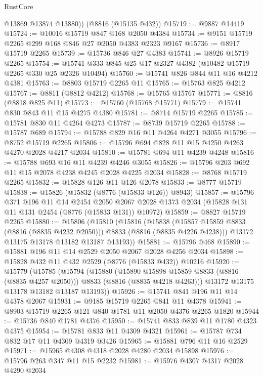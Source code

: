 \begin{lexlean}{RustCore}
\begin{coremodule}
        @13869
        @13874
        @13880))
    (@8816 (@15135 @432))
@15719 := @9887 @14419
@15724 := @10016 @15719 @847 @168 @2050 @4384
@15734 := @9151 @15719 @2265 @299 @168 @846 @27 @2050 @4383 @2323 @9167
@15736 := @8917 @15719 @2265
@15739 := @15736 @846 @27 @4383
@15741 := @8926 @15719 @2265
@15754 := @15741 @333 @845 @25 @17 @2327 @4382 (@10482 @15719 @2265 @330 @25 @2326 @10494)
@15760 := @15741 @826 @844 @11 @16 @4212 @4381
@15763 := @8803 @15719 @2265 @11
@15765 := @15763 @825 @4212
@15767 := @8811 (@8812 @4212)
@15768 := @15765 @15767
@15771 := @8816 (@8818 @825 @11)
@15773 := @15760 (@15768 @15771)
@15779 := @15741 @830 @843 @11 @15 @4275 @4380
@15781 := @8714 @15719 @2265
@15785 := @15781 @830 @11 @4264 @4273
@15787 := @8739 @15719 @2265
@15788 := @15787 @689
@15794 := @15788 @829 @16 @11 @4264 @4271 @3055
@15796 := @8752 @15719 @2265
@15806 := @15796 @694 @828 @11 @15 @4250 @4263 @4270 @2028 @4217 @2034
@15810 := @15781 @694 @11 @4239 @4248
@15816 := @15788 @693 @16 @11 @4239 @4246 @3055
@15826 := @15796 @203 @692 @11 @15 @2078 @4238 @4245 @2028 @4225 @2034
@15828 := @8768 @15719 @2265
@15832 := @15828 @126 @11 @126 @2078
@15833 := @8777 @15719
@15838 := @15826 (@15832 (@8776 (@15833 @126)) @8943)
@15857 := @15796
    @371
    @196
    @11
    @14
    @2454
    @2050
    @2067
    @2028
    @1373
    @2034
    (@15828 @131 @11 @131 @2454 (@8776 (@15833 @131)) @10972)
@15859 := @8827 @15719 @2265
@15880 := @15806
    (@15810
      (@15816
        (@15838 (@15857 @15859 @8833 (@8816 (@8835 @4232 @2050))) @8833 (@8816 (@8835 @4226 @4238)))
        @13172
        @13175
        @13178
        @13182
        @13187
        @13193))
@15881 := @15796 @468
@15890 := @15881 @196 @11 @14 @2529 @2050 @2067 @2028 @4256 @2034
@15898 := @15828 @432 @11 @432 @2529 (@8776 (@15833 @432)) @10216
@15920 := @15779
    (@15785
      (@15794
        (@15880
          (@15890 @15898 @15859 @8833 (@8816 (@8835 @4257 @2050)))
          @8833
          (@8816 (@8835 @4218 @4263)))
        @13172
        @13175
        @13178
        @13182
        @13187
        @13193))
@15926 := @15741 @841 @196 @11 @14 @4378 @2067
@15931 := @9185 @15719 @2265 @841 @11 @4378
@15941 := @8903 @15719 @2265 @121 @840 @1781 @11 @2050 @4376 @2265 @1820
@15944 := @15736 @840 @1781 @4376
@15950 := @15741 @833 @839 @11 @1780 @4323 @4375
@15954 := @15781 @833 @11 @4309 @4321
@15961 := @15787 @734 @832 @17 @11 @4309 @4319 @3426
@15965 := @15881 @796 @11 @16 @2529
@15971 := @15965 @4308 @4318 @2028 @4280 @2034 @15898
@15976 := @15796 @263 @347 @11 @15 @2232
@15981 := @15976 @4307 @4317 @2028 @4290 @2034

\end{coremodule}
\end{lexlean}
